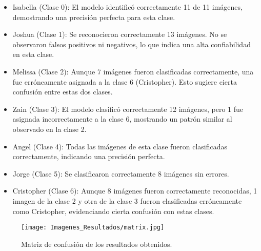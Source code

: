 \documentclass[12pt, letterpaper]{article}
\begin{document}
\begin{itemize}
    \item Isabella (Clase 0): El modelo identificó correctamente 11 de 11 imágenes, demostrando una precisión perfecta para esta clase.
    \item Joshua (Clase 1): Se reconocieron correctamente 13 imágenes. No se observaron falsos positivos ni negativos, lo que indica una alta confiabilidad en esta clase.
    \item Melissa (Clase 2): Aunque 7 imágenes fueron clasificadas correctamente, una fue erróneamente asignada a la clase 6 (Cristopher). Esto sugiere cierta confusión entre estas dos clases.
    \item Zain (Clase 3): El modelo clasificó correctamente 12 imágenes, pero 1 fue asignada incorrectamente a la clase 6, mostrando un patrón similar al observado en la clase 2.
    \item Angel (Clase 4): Todas las imágenes de esta clase fueron clasificadas correctamente, indicando una precisión perfecta.
    \item Jorge (Clase 5): Se clasificaron correctamente 8 imágenes sin errores.
    \item Cristopher (Clase 6): Aunque 8 imágenes fueron correctamente reconocidas, 1 imagen de la clase 2 y otra de la clase 3 fueron clasificadas erróneamente como Cristopher, evidenciando cierta confusión con estas clases.
\end{itemize}

\begin{figure}[H]
    \centering
    \texttt{[image: Imagenes\_Resultados/matrix.jpg]} %
    \caption{Matriz de confusión de los resultados obtenidos.}
    \label{fig:etiqueta}
\end{figure}

\end{document}
